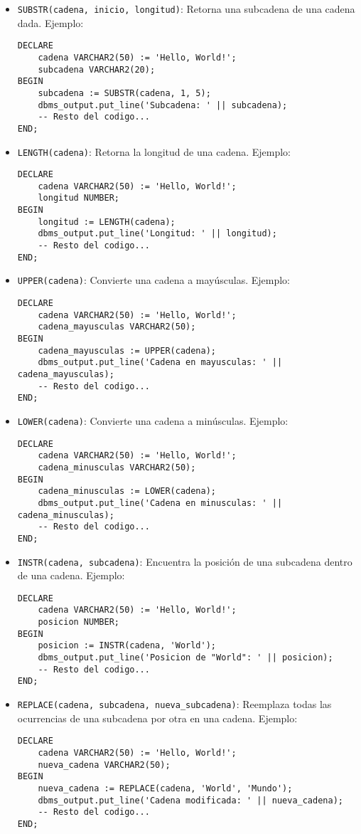 \documentclass[executivepaper]{article}
\begin{document}
\begin{itemize}
    \item \texttt{SUBSTR(cadena, inicio, longitud)}: Retorna una subcadena de una cadena dada. Ejemplo:
\begin{lstlisting}
DECLARE
    cadena VARCHAR2(50) := 'Hello, World!';
    subcadena VARCHAR2(20);
BEGIN
    subcadena := SUBSTR(cadena, 1, 5);
    dbms_output.put_line('Subcadena: ' || subcadena);
    -- Resto del codigo...
END;
\end{lstlisting}
 
    \item \texttt{LENGTH(cadena)}: Retorna la longitud de una cadena. Ejemplo:
\begin{lstlisting}
DECLARE
    cadena VARCHAR2(50) := 'Hello, World!';
    longitud NUMBER;
BEGIN
    longitud := LENGTH(cadena);
    dbms_output.put_line('Longitud: ' || longitud);
    -- Resto del codigo...
END;
\end{lstlisting}

    \item \texttt{UPPER(cadena)}: Convierte una cadena a mayúsculas. Ejemplo:
\begin{lstlisting}
DECLARE
    cadena VARCHAR2(50) := 'Hello, World!';
    cadena_mayusculas VARCHAR2(50);
BEGIN
    cadena_mayusculas := UPPER(cadena);
    dbms_output.put_line('Cadena en mayusculas: ' || cadena_mayusculas);
    -- Resto del codigo...
END;
\end{lstlisting}
 
    \item \texttt{LOWER(cadena)}: Convierte una cadena a minúsculas. Ejemplo:
\begin{lstlisting}
DECLARE
    cadena VARCHAR2(50) := 'Hello, World!';
    cadena_minusculas VARCHAR2(50);
BEGIN
    cadena_minusculas := LOWER(cadena);
    dbms_output.put_line('Cadena en minusculas: ' || cadena_minusculas);
    -- Resto del codigo...
END;
\end{lstlisting}
 
    \item \texttt{INSTR(cadena, subcadena)}: Encuentra la posición de una subcadena dentro de una cadena. Ejemplo:
\begin{lstlisting}
DECLARE
    cadena VARCHAR2(50) := 'Hello, World!';
    posicion NUMBER;
BEGIN
    posicion := INSTR(cadena, 'World');
    dbms_output.put_line('Posicion de "World": ' || posicion);
    -- Resto del codigo...
END;
\end{lstlisting}
 
    \item \texttt{REPLACE(cadena, subcadena, nueva\_subcadena)}: Reemplaza todas las ocurrencias de una subcadena por otra en una cadena. Ejemplo:
\begin{lstlisting}
DECLARE
    cadena VARCHAR2(50) := 'Hello, World!';
    nueva_cadena VARCHAR2(50);
BEGIN
    nueva_cadena := REPLACE(cadena, 'World', 'Mundo');
    dbms_output.put_line('Cadena modificada: ' || nueva_cadena);
    -- Resto del codigo...
END;
\end{lstlisting}
 

\end{itemize}
\end{document}
